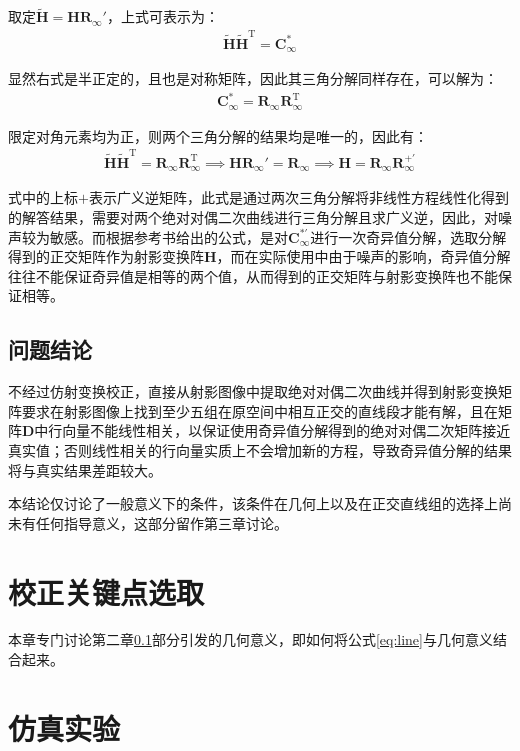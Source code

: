 \documentclass[11pt]{article}
\begin{document}
取定$\tilde{\mathbf{H}}=\mathbf{HR_\infty'}$，上式可表示为：
\begin{align*}
  \tilde{\mathbf{{H}}}\tilde{\mathbf{H}}^\mathrm{T}=\mathbf{C_\infty^*}
\end{align*}\par
显然右式是半正定的，且也是对称矩阵，因此其三角分解同样存在，可以解为：
\begin{align*}
  \mathbf{C_\infty^*}=\mathbf{R_\infty R_\infty^\mathrm{T}}
\end{align*}\par
限定对角元素均为正，则两个三角分解的结果均是唯一的，因此有：
\begin{align}
  \tilde{\mathbf{{H}}}\tilde{\mathbf{H}}^\mathrm{T}=\mathbf{R_\infty R_\infty^\mathrm{T}}\implies\mathbf{HR_\infty'=R_\infty}\implies\mathbf{H=R_\infty R_\infty^{+'}}
  \label{eq:Cholesky}
\end{align}\par
式中的上标$+$表示广义逆矩阵，此式是通过两次三角分解将非线性方程线性化得到的解答结果，需要对两个绝对对偶二次曲线进行三角分解且求广义逆，因此，对噪声较为敏感。而根据参考书\cite{hartley2003multiple}给出的公式，是对$\mathbf{C_\infty^{*'}}$进行一次奇异值分解，选取分解得到的正交矩阵作为射影变换阵$\mathbf{H}$，而在实际使用中由于噪声的影响，奇异值分解往往不能保证奇异值是相等的两个值，从而得到的正交矩阵与射影变换阵也不能保证相等。
\subsection{问题结论}
\label{sec:问题结论}
不经过仿射变换校正，直接从射影图像中提取绝对对偶二次曲线并得到射影变换矩阵要求在射影图像上找到至少五组在原空间中相互正交的直线段才能有解，且在矩阵$\mathbf{D}$中行向量不能线性相关，以保证使用奇异值分解得到的绝对对偶二次矩阵接近真实值；否则线性相关的行向量实质上不会增加新的方程，导致奇异值分解的结果将与真实结果差距较大。\par
本结论仅讨论了一般意义下的条件，该条件在几何上以及在正交直线组的选择上尚未有任何指导意义，这部分留作第三章讨论。
\section{校正关键点选取}
本章专门讨论第二章\ref{sec:问题结论}部分引发的几何意义，即如何将公式\ref{eq:line}与几何意义结合起来。
\section{仿真实验}
\newpage
\printbibliography[heading=bibliography,title=参考文献]
\end{document}
